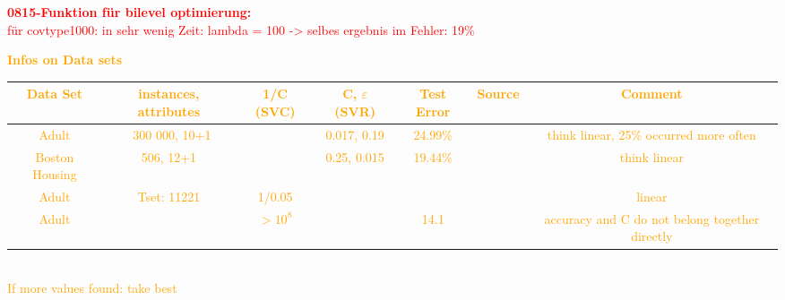 \textcolor{red}{\textbf{0815-Funktion f\"ur bilevel optimierung:}\\
für covtype1000: in sehr wenig Zeit: lambda = 100 -> selbes ergebnis im Fehler: 19\%\\
}


\textcolor{orange}{\textbf{Infos on Data sets} \\
\begin{tabular}{c|c|c|c|c|c|c}
Data Set & instances, attributes & 1/C (SVC) & C, \(\varepsilon\) (SVR) & Test Error & Source & Comment \\
\hline
Adult & ~300 000, 10+1 & & 0.017, 0.19 & 24.99\% & \cite{Musicant2004} & think linear, 25\% occurred more often \cite{Musicant2000} \\
Boston Housing & 506, 12+1 & & 0.25, 0.015 & 19.44\% & \cite{Musicant2004} & think linear\\
Adult & Tset: 11221 & 1/0.05 & & & \cite{Platt1999} & linear \\
Adult & & \(>10^8\) & & 14.1 & \cite{Kao2004} & accuracy and C do not belong together directly
\end{tabular}\\
If more values found: take best}













